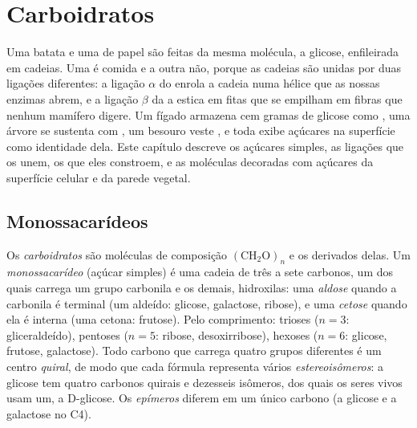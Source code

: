 \chapter{Carboidratos}\label{ch:b1:carbohydrates}

Uma batata e uma  de papel são feitas da mesma molécula, a glicose,
enfileirada em cadeias. Uma é comida e a outra não, porque as cadeias
são unidas por duas ligações diferentes: a ligação $\alpha$ do 
enrola a cadeia numa hélice que as nossas enzimas abrem, e a ligação
$\beta$ da  a estica em fitas que se empilham em fibras que
nenhum mamífero digere. Um fígado armazena cem gramas de glicose como
, uma árvore se sustenta com , um besouro veste
, e toda  exibe açúcares na superfície como identidade
dela. Este capítulo descreve os açúcares simples, as ligações que os
unem, os  que eles constroem, e as moléculas decoradas
com açúcares da superfície celular e da parede vegetal.

\section{Monossacarídeos}

\begin{definition}[Monossacarídeo]\label{def:b1:carbohydrates:monosaccharide}
Os \emph{carboidratos} são moléculas de composição
$(\mathrm{CH_2O})_n$ e os derivados delas. Um
\emph{monossacarídeo} (açúcar simples) é uma
cadeia de três a sete carbonos, um dos quais carrega um grupo carbonila
e os demais, hidroxilas: uma \emph{aldose} quando a
carbonila é terminal (um aldeído: glicose, galactose, ribose), e uma
\emph{cetose} quando ela é interna (uma cetona: frutose).
Pelo comprimento: trioses ($n = 3$: gliceraldeído), pentoses ($n = 5$:
ribose, desoxirribose), hexoses ($n = 6$: glicose, frutose, galactose).
Todo carbono que carrega quatro grupos diferentes é um centro
\emph{quiral}, de modo que cada fórmula representa vários
\emph{estereoisômeros}: a glicose tem quatro carbonos quirais e
dezesseis isômeros, dos quais os seres vivos usam um, a D-glicose. Os
\emph{epímeros} diferem em um único carbono (a glicose e a galactose no
C4).
\end{definition}

